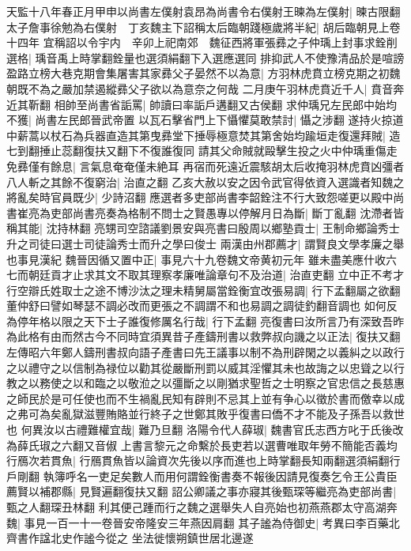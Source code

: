 天監十八年春正月甲申以尚書左僕射袁昂為尚書令右僕射王暕為左僕射|{
	暕古限翻}
太子詹事徐勉為右僕射　丁亥魏主下詔稱太后臨朝踐極歲將半紀|{
	胡后臨朝見上卷十四年}
宜稱詔以令宇内　辛卯上祀南郊　魏征西將軍張彞之子仲瑀上封事求銓削選格|{
	瑀音禹上時掌翻銓量也選須絹翻下入選應選同}
排抑武人不使豫清品於是喧謗盈路立榜大巷克期會集屠害其家彞父子晏然不以為意|{
	方羽林虎賁立榜克期之初魏朝既不為之嚴加禁遏縱彞父子欲以為意奈之何哉}
二月庚午羽林虎賁近千人|{
	賁音奔近其靳翻}
相帥至尚書省詬罵|{
	帥讀曰率詬戶遘翻又古侯翻}
求仲瑀兄左民郎中始均不獲|{
	尚書左民郎晉武帝置}
以瓦石擊省門上下懾懼莫敢禁討|{
	懾之涉翻}
遂持火掠道中薪蒿以杖石為兵器直造其第曳彞堂下捶辱極意焚其第舍始均踰垣走復還拜賊|{
	造七到翻捶止蕊翻復扶又翻下不復誰復同}
請其父命賊就毆擊生投之火中仲瑀重傷走免彞僅有餘息|{
	言氣息奄奄僅未絶耳}
再宿而死遠近震駭胡太后收掩羽林虎賁凶彊者八人斬之其餘不復窮治|{
	治直之翻}
乙亥大赦以安之因令武官得依資入選識者知魏之將亂矣時官員既少|{
	少詩沼翻}
應選者多吏部尚書李韶銓注不行大致怨嗟更以殿中尚書崔亮為吏部尚書亮奏為格制不問士之賢愚專以停解月日為斷|{
	斷丁亂翻}
沈滯者皆稱其能|{
	沈持林翻}
亮甥司空諮議劉景安與亮書曰殷周以鄉塾貢士|{
	王制命鄉論秀士升之司徒曰選士司徒論秀士而升之學曰俊士}
兩漢由州郡薦才|{
	謂賢良文學孝廉之舉也事見漢紀}
魏晉因循又置中正|{
	事見六十九卷魏文帝黄初元年}
雖未盡美應什收六七而朝廷貢才止求其文不取其理察孝廉唯論章句不及治道|{
	治直吏翻}
立中正不考才行空辯氏姓取士之途不博沙汰之理未精舅屬當銓衡宜改張易調|{
	行下孟翻屬之欲翻董仲舒曰譬如琴瑟不調必改而更張之不調謂不和也易調之調徒釣翻音調也}
如何反為停年格以限之天下士子誰復修厲名行哉|{
	行下孟翻}
亮復書曰汝所言乃有深致吾昨為此格有由而然古今不同時宜須異昔子產鑄刑書以救弊叔向譏之以正法|{
	復扶又翻左傳昭六年鄭人鑄刑書叔向語子產書曰先王議事以制不為刑辟閑之以義糾之以政行之以禮守之以信制為禄位以勸其從嚴斷刑罰以威其淫懼其未也故誨之以忠聳之以行教之以務使之以和臨之以敬涖之以彊斷之以剛猶求聖哲之士明察之官忠信之長慈惠之師民於是可任使也而不生禍亂民知有辟則不忌其上並有争心以徵於書而儌幸以成之弗可為矣亂獄滋豐賄賂並行終子之世鄭其敗乎復書曰僑不才不能及子孫吾以救世也}
何異汝以古禮難權宜哉|{
	難乃旦翻}
洛陽令代人薛琡|{
	魏書官氏志西方叱于氏後改為薛氏琡之六翻又音俶}
上書言黎元之命繫於長吏若以選曹唯取年勞不簡能否義均行鴈次若貫魚|{
	行鴈貫魚皆以論資次先後以序而進也上時掌翻長知兩翻選須絹翻行戶剛翻}
執簿呼名一吏足矣數人而用何謂銓衡書奏不報後因請見復奏乞令王公貴臣薦賢以補郡縣|{
	見賢遍翻復扶又翻}
詔公卿議之事亦寢其後甄琛等繼亮為吏部尚書|{
	甄之人翻琛丑林翻}
利其便己踵而行之魏之選舉失人自亮始也初燕燕郡太守高湖奔魏|{
	事見一百一十一卷晉安帝隆安三年燕因肩翻}
其子謐為侍御史|{
	考異曰李百藥北齊書作諡北史作謐今從之}
坐法徙懷朔鎮世居北邊遂

